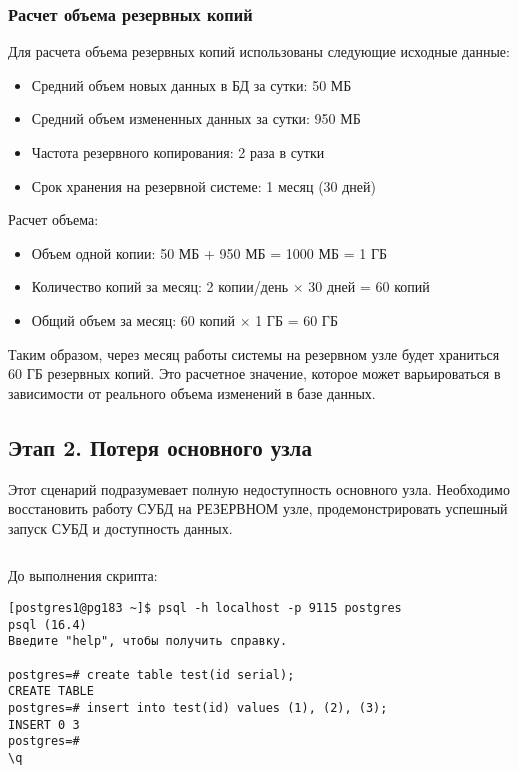 \subsubsection{Расчет объема резервных копий}

Для расчета объема резервных копий использованы следующие исходные данные:
\begin{itemize}
    \item Средний объем новых данных в БД за сутки: 50 МБ
    \item Средний объем измененных данных за сутки: 950 МБ
    \item Частота резервного копирования: 2 раза в сутки
    \item Срок хранения на резервной системе: 1 месяц (30 дней)
\end{itemize}

Расчет объема:
\begin{itemize}
    \item Объем одной копии: 50 МБ + 950 МБ = 1000 МБ = 1 ГБ
    \item Количество копий за месяц: 2 копии/день $\times$ 30 дней = 60 копий
    \item Общий объем за месяц: 60 копий $\times$ 1 ГБ = 60 ГБ
\end{itemize}

Таким образом, через месяц работы системы на резервном узле будет храниться 60 ГБ резервных копий. Это расчетное значение, которое может варьироваться в зависимости от реального объема изменений в базе данных.

\subsection{Этап 2. Потеря основного узла}

Этот сценарий подразумевает полную недоступность основного узла. Необходимо восстановить работу СУБД на РЕЗЕРВНОМ узле, продемонстрировать успешный запуск СУБД и доступность данных.

\inputminted[breaklines,linenos,frame=single]{bash}{restore.sh}

До выполнения скрипта:

\begin{verbatim}
[postgres1@pg183 ~]$ psql -h localhost -p 9115 postgres
psql (16.4)
Введите "help", чтобы получить справку.

postgres=# create table test(id serial);
CREATE TABLE
postgres=# insert into test(id) values (1), (2), (3);
INSERT 0 3
postgres=#
\q
\end{verbatim}

